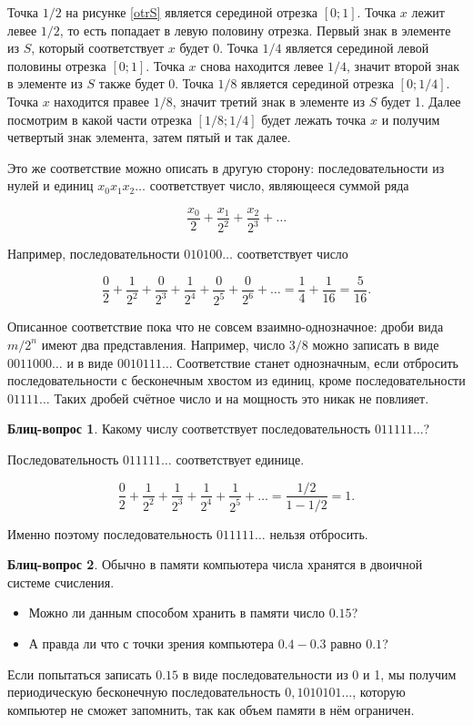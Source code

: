 \documentclass[pdftex, 12pt, a4paper]{article}
\theoremstyle{definition} %
\numberwithin{problem}{section}
\newtheorem{blits}{Блиц-вопрос}
\numberwithin{blits}{section}
\begin{document}
\begin{itemize}
\begin{itemize}
Точка $1/2$ на рисунке \ref{otrS} является серединой отрезка $[0; 1]$. Точка $x$ лежит левее $1/2$, то есть попадает в левую половину отрезка. Первый знак в элементе из $S$, который соответствует $x$ будет 0. Точка $1/4$ является серединой левой  половины отрезка $[0;1]$. Точка $x$ снова находится левее $1/4$, значит второй знак в элементе из $S$ также будет 0. Точка $1/8$ является серединой отрезка $[0; 1/4]$. Точка $x$ находится правее $1/8$, значит третий знак в элементе из $S$ будет 1. Далее посмотрим в какой части отрезка $[1/8; 1/4]$ будет лежать точка $x$ и получим четвертый знак элемента, затем пятый и так далее.

Это же соответствие можно описать в другую сторону: последовательности из нулей и единиц $x_0 x_1 x_2 \dots$ соответствует число, являющееся суммой ряда

\[ \frac{x_0}{2}+\frac{x_1}{2^2}+\frac{x_2}{2^3}+\dots \]

Например, последовательности $010100 \dots$ соответствует число

\[\frac{0}{2}+\frac{1}{2^2}+\frac{0}{2^3}+\frac{1}{2^4}+\frac{0}{2^5}+\frac{0}{2^6}+ \dots =  \frac{1}{4}+\frac{1}{16}= \frac{5}{16}.\]

Описанное соответствие пока что не совсем взаимно-однозначное: дроби вида $m/2^n$ имеют два представления. Например, число $3/8$ можно записать в виде $0011000 \dots$ и в виде $0010111 \dots$ Соответствие станет однозначным, если отбросить последовательности с бесконечным хвостом из единиц, кроме последовательности $01111 \dots$ Таких дробей счётное число и на мощность это никак не повлияет.

\begin{blits}
Какому числу соответствует последовательность $011111 \dots$?
\begin{blitssol}
Последовательность $011111 \dots$ соответствует единице.

\[\frac{0}{2} + \frac{1}{2^2} + \frac{1}{2^3} + \frac{1}{2^4} + \frac{1}{2^5} + \ldots = \frac{1/2}{1-1/2} = 1.\]

Именно поэтому последовательность $011111 \dots$ нельзя отбросить.
\end{blitssol}
\end{blits}


\begin{blits}
Обычно в памяти компьютера числа хранятся в двоичной системе счисления.
\begin{itemize}
\item Можно ли данным способом хранить в памяти число $0.15$?
\item А правда ли что с точки зрения компьютера $0.4 - 0.3$ равно $0.1$?
\end{itemize}
\begin{blitssol}
Если попытаться записать $0.15$ в виде последовательности из 0 и 1, мы получим периодическую бесконечную последовательность $0,1010101 \dots$, которую компьютер не сможет запомнить, так как объем памяти в нём ограничен.


\end{blitssol}
\end{blits}
\end{itemize}
\end{itemize}
\end{document}
